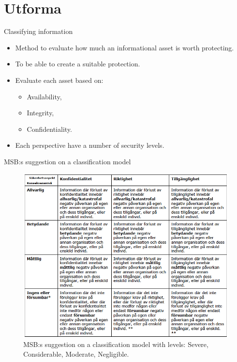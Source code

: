 \documentclass{beamer}
\begin{document}
\section{Utforma}
\begin{frame}{Classifying information}
  \begin{itemize}
    \item Method to evaluate how much an informational asset is worth
      protecting.

    \item To be able to create a suitable protection.

    \item Evaluate each asset based on:
      \begin{itemize}
        \item Availability,
        \item Integrity,
        \item Confidentiality.
      \end{itemize}

    \item Each perspective have a number of security levels.

  \end{itemize}
\end{frame}

\begin{frame}{MSB:s suggestion on a classification model}
  \begin{figure}
    \includegraphics[height=0.7\textheight]{Figures/msb-klassificering.png}
    \caption{MSB:s suggestion on a classification model with levels: Severe, Considerable,
      Moderate, Negligible.}
  \end{figure}
\end{frame}
\end{document}
